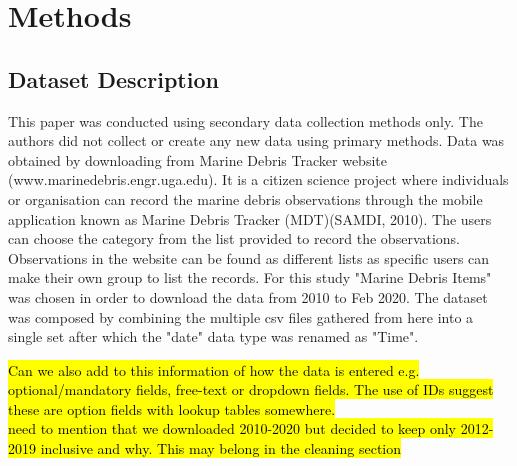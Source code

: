 \documentclass[10pt]{article}\usepackage[]{graphicx}\usepackage[]{color}
\begin{document}
\pagebreak
\section {Methods}\label{methods}

\subsection{Dataset Description}\label{dataset}

This paper was conducted using secondary data collection methods only. The authors did not collect or create any new data using primary methods. Data was obtained by downloading from Marine Debris Tracker website (www.marinedebris.engr.uga.edu). It is a citizen science project where individuals or organisation can record the marine debris observations through the mobile application known as Marine Debris Tracker (MDT)(SAMDI, 2010). \cite{JAMBECK2015B} The users can choose the category from the list provided to record the observations. Observations in the website can be found as different lists as specific users can make their own group to list the records. For this study "Marine Debris Items" was chosen in order to download the data from 2010 to Feb 2020. The dataset was composed by combining the multiple csv files gathered from here into a single set after which the  "date" data type was renamed as "Time".

\hl{Can we also add to this information of how the data is entered e.g. optional/mandatory fields, free-text or dropdown fields. The use of IDs suggest these are option fields with lookup tables somewhere.} \\

\hl{need to mention that we downloaded 2010-2020 but decided to keep only 2012-2019 inclusive and why. This may belong in the cleaning section}
\end{document}
